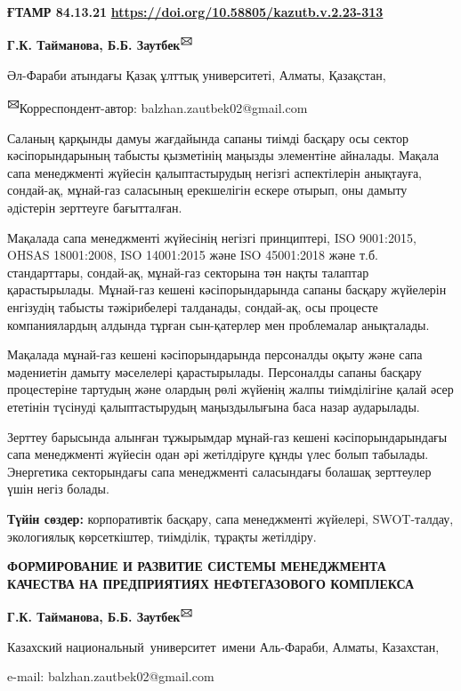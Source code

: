 \newpage
{\bfseries ҒТАМР 84.13.21}
\hfill {\bfseries \href{https://doi.org/10.58805/kazutb.v.2.23-313}{https://doi.org/10.58805/kazutb.v.2.23-313}}


\begin{center}
{\bfseries Г.К. Тайманова, Б.Б. Заутбек\textsuperscript{🖂}}

Әл-Фараби атындағы Қазақ ұлттық университеті, Алматы, Қазақстан,

{\bfseries \textsuperscript{🖂}}Корреспондент-автор:
balzhan.zautbek02@gmail.com
\end{center}

Саланың қарқынды дамуы жағдайында сапаны тиімді басқару осы сектор
кәсіпорындарының табысты қызметінің маңызды элементіне айналады. Мақала
сапа менеджменті жүйесін қалыптастырудың негізгі аспектілерін анықтауға,
сондай-ақ, мұнай-газ саласының ерекшелігін ескере отырып, оны дамыту
әдістерін зерттеуге бағытталған.

Мақалада сапа менеджменті жүйесінің негізгі принциптері, ISO 9001:2015,
OHSAS 18001:2008, ISO 14001:2015 және ISO 45001:2018 және т.б.
стандарттары, сондай-ақ, мұнай-газ секторына тән нақты талаптар
қарастырылады. Мұнай-газ кешені кәсіпорындарында сапаны басқару
жүйелерін енгізудің табысты тәжірибелері талданады, сондай-ақ, осы
процесте компаниялардың алдында тұрған сын-қатерлер мен проблемалар
анықталады.

Мақалада мұнай-газ кешені кәсіпорындарында персоналды оқыту және сапа
мәдениетін дамыту мәселелері қарастырылады. Персоналды сапаны басқару
процестеріне тартудың және олардың рөлі жүйенің жалпы тиімділігіне қалай
әсер ететінін түсінуді қалыптастырудың маңыздылығына баса назар
аударылады.

Зерттеу барысында алынған тұжырымдар мұнай-газ кешені кәсіпорындарындағы
сапа менеджменті жүйесін одан әрі жетілдіруге құнды үлес болып табылады.
Энергетика секторындағы сапа менеджменті саласындағы болашақ зерттеулер
үшін негіз болады.

{\bfseries Түйін сөздер:} корпоративтік басқару, сапа менеджменті жүйелері,
SWOT-талдау, экологиялық көрсеткіштер, тиімділік, тұрақты жетілдіру.

\begin{center}
{\large\bfseries ФОРМИРОВАНИЕ И РАЗВИТИЕ СИСТЕМЫ МЕНЕДЖМЕНТА КАЧЕСТВА НА
ПРЕДПРИЯТИЯХ НЕФТЕГАЗОВОГО КОМПЛЕКСА}

{\bfseries Г.К. Тайманова, Б.Б. Заутбек\textsuperscript{🖂}}

Казахский национальный~университет~имени Аль-Фараби, Алматы, Казахстан,

e-mail: balzhan.zautbek02@gmail.com
\end{center}


